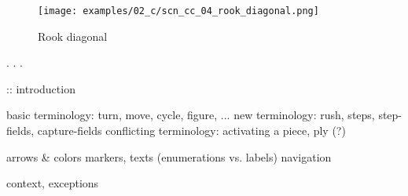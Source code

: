 \vspace*{13.7\baselineskip}
\noindent
\begin{wrapfigure}[1]{l}{0.4\textwidth}
\centering
\texttt{[image: examples/02\_c/scn\_cc\_04\_rook\_diagonal.png]}
\vspace*{-1.4\baselineskip}
\caption{Rook diagonal}
\label{fig:scn_cc_04_rook_diagonal}
\end{wrapfigure}
. . .


\clearpage %

\noindent
\TODO :: introduction \newline

\noindent
\textrightarrow basic terminology: turn, move, cycle, figure, ... \newline
\textrightarrow new terminology: rush, steps, step-fields, capture-fields \newline
\textrightarrow conflicting terminology: activating a piece, ply (?) \newline

\noindent
\textrightarrow arrows \& colors \newline
\textrightarrow markers, texts (enumerations vs. labels) \newline
\textrightarrow navigation \newline

\noindent
\textrightarrow context, exceptions \newline

\clearpage %

